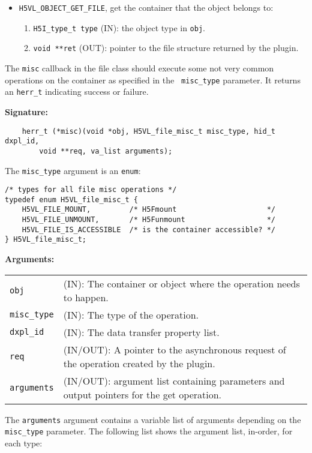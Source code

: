 \begin{itemize}
\item {\tt H5VL\_OBJECT\_GET\_FILE}, get the container that the object
  belongs to:
  \begin{enumerate}
  \item {\tt H5I\_type\_t type} (IN): the object type in {\tt obj}.
  \item {\tt void **ret} (OUT): pointer to the file structure returned
    by the plugin.
  \end{enumerate}
\end{itemize}

The {\tt misc} callback in the file class should execute some not very
common operations on the container as specified in the {\tt
  misc\_type} parameter. It returns an {\tt herr\_t} indicating
success or failure.

\textbf{Signature:}
\begin{lstlisting}
    herr_t (*misc)(void *obj, H5VL_file_misc_t misc_type, hid_t dxpl_id, 
        void **req, va_list arguments);
\end{lstlisting}

The {\tt misc\_type} argument is an {\tt enum}:
\begin{lstlisting}
/* types for all file misc operations */
typedef enum H5VL_file_misc_t {
    H5VL_FILE_MOUNT,         /* H5Fmount                     */
    H5VL_FILE_UNMOUNT,       /* H5Funmount                   */
    H5VL_FILE_IS_ACCESSIBLE  /* is the container accessible? */
} H5VL_file_misc_t;
\end{lstlisting}

\textbf{Arguments:}\\
\begin{tabular}{l p{10cm}}
  {\tt obj} & (IN): The container or object where the operation needs
  to happen.\\
  {\tt misc\_type} & (IN): The type of the operation.\\
  {\tt dxpl\_id} & (IN): The data transfer property list.\\
  {\tt req} & (IN/OUT): A pointer to the asynchronous request of the
  operation created by the plugin.\\
  {\tt arguments} & (IN/OUT): argument list containing parameters and
  output pointers for the get operation. \\
\end{tabular}

The {\tt arguments} argument contains a variable list of arguments
depending on the {\tt misc\_type} parameter. The following list shows
the argument list, in-order, for each type:


